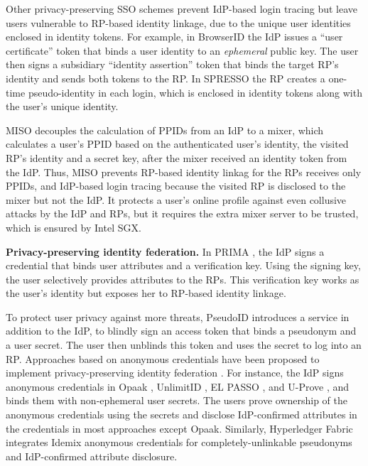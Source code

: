 Other privacy-preserving SSO schemes prevent IdP-based login tracing but leave users vulnerable to RP-based identity linkage, due to the unique user identities enclosed in identity tokens.
For example, in BrowserID \cite{BrowserID} %
the IdP %
issues a ``user certificate'' token that binds a user identity to an \emph{ephemeral} public key. The user then signs a subsidiary ``identity assertion'' token that binds the target RP's identity and sends both tokens to the RP. In SPRESSO \cite{SPRESSO} the RP creates a one-time pseudo-identity in each login, which is enclosed in identity tokens along with the user's unique identity.

MISO \cite{miso} decouples the calculation of PPIDs from an IdP
        to a mixer,
        which calculates a user's PPID
    based on the authenticated user's identity, the visited RP's identity and a secret key,
    after the mixer received an identity token from the IdP.
Thus, MISO prevents RP-based identity linkag for the RPs receives only PPIDs,
    and IdP-based login tracing because the visited RP is disclosed to the mixer but not the IdP.
It protects a user's online profile against even collusive attacks by the IdP and RPs,
    but it requires the extra mixer server to be trusted,
        which is ensured by Intel SGX.


\newc
\noindent\textbf{Privacy-preserving identity federation.}
\oldc
In PRIMA \cite{prima}, the IdP signs a credential
that binds user attributes and a verification key. Using the signing key, the user selectively provides attributes to the RPs. This verification key works as the user's identity but exposes her to RP-based identity linkage.

To protect user privacy against more threats, PseudoID \cite{PseudoID} introduces a service in addition to the IdP,
 to blindly sign \cite{blind-sign}
an access token that binds a pseudonym and a user secret.
The user then unblinds this token and uses the secret to log into an RP. Approaches based on anonymous credentials \cite{anon-credential-2001, idemix, anon-credential} have been proposed to implement privacy-preserving identity federation \cite{hyperledge-idemix, Opaak, uprov, UnlimitID, ELPASSO}. For instance, the IdP signs anonymous credentials in Opaak \cite{Opaak}, UnlimitID \cite{UnlimitID}, EL PASSO \cite{ELPASSO}, and U-Prove \cite{uprov,uprove-conference}, and binds them with non-ephemeral user secrets. %
The users prove ownership of the anonymous credentials using the secrets and disclose IdP-confirmed attributes in the credentials in most approaches except Opaak. Similarly, Hyperledger Fabric \cite{hyperledge-idemix} integrates Idemix anonymous credentials \cite{idemix} for completely-unlinkable pseudonyms and IdP-confirmed attribute disclosure.



